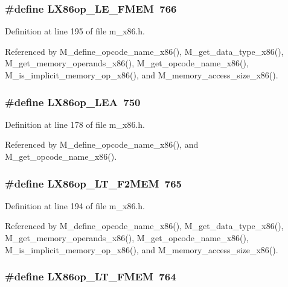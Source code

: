 \subsubsection{\setlength{\rightskip}{0pt plus 5cm}\#define LX86op\_\-LE\_\-FMEM~766}\label{m__x86_8h_fbd9ab9b8967ce1b3796fcf1bdc6654b}




Definition at line 195 of file m\_\-x86.h.

Referenced by M\_\-define\_\-opcode\_\-name\_\-x86(), M\_\-get\_\-data\_\-type\_\-x86(), M\_\-get\_\-memory\_\-operands\_\-x86(), M\_\-get\_\-opcode\_\-name\_\-x86(), M\_\-is\_\-implicit\_\-memory\_\-op\_\-x86(), and M\_\-memory\_\-access\_\-size\_\-x86().
\subsubsection{\setlength{\rightskip}{0pt plus 5cm}\#define LX86op\_\-LEA~750}\label{m__x86_8h_38c7132f361392c81b781476a4708b21}




Definition at line 178 of file m\_\-x86.h.

Referenced by M\_\-define\_\-opcode\_\-name\_\-x86(), and M\_\-get\_\-opcode\_\-name\_\-x86().
\subsubsection{\setlength{\rightskip}{0pt plus 5cm}\#define LX86op\_\-LT\_\-F2MEM~765}\label{m__x86_8h_364e30f061fc222e2e447109c5a30a4c}




Definition at line 194 of file m\_\-x86.h.

Referenced by M\_\-define\_\-opcode\_\-name\_\-x86(), M\_\-get\_\-data\_\-type\_\-x86(), M\_\-get\_\-memory\_\-operands\_\-x86(), M\_\-get\_\-opcode\_\-name\_\-x86(), M\_\-is\_\-implicit\_\-memory\_\-op\_\-x86(), and M\_\-memory\_\-access\_\-size\_\-x86().
\subsubsection{\setlength{\rightskip}{0pt plus 5cm}\#define LX86op\_\-LT\_\-FMEM~764}\label{m__x86_8h_f504ea7ab9c8d2b4815fdf459ec8acc4}




